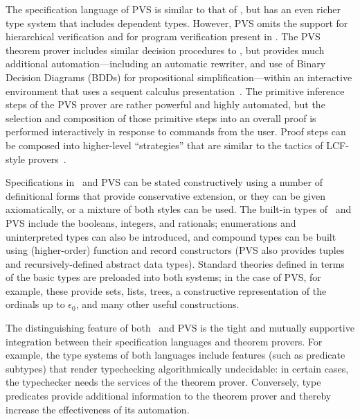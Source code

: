 The specification language of PVS is similar to that of \ehdm, but
has an even richer type system that includes dependent types.
However, PVS omits the support for hierarchical verification and for
program verification present in \ehdm.  The PVS theorem prover
includes similar decision procedures to \ehdm, but provides much
additional automation---including an automatic rewriter, and
use of Binary Decision Diagrams (BDDs) for propositional
simplification---within an interactive
environment that uses a sequent calculus
presentation~\cite{PVS-CADE92}.  The primitive inference steps of the
PVS prover are rather powerful and highly automated, but the
selection and composition of those primitive steps into an overall
proof is performed interactively in response to commands from the
user.  Proof steps can be composed into higher-level ``strategies''
that are similar to the tactics of LCF-style provers~\cite{LCF}.


Specifications in \ehdm\ and PVS can be stated constructively using a
number of definitional forms that provide conservative extension, or
they can be given axiomatically, or a mixture of both styles can be
used.  The built-in types of \ehdm\ and PVS include the booleans,
integers, and rationals; enumerations and uninterpreted types can
also be introduced, and compound types can be built using
(higher-order) function and record constructors (PVS also provides
tuples and recursively-defined abstract data types).  Standard
theories defined in terms of the basic types are preloaded into both
systems; in the case of PVS, for example, these provide sets, lists,
trees, a constructive representation of the ordinals up to
$\epsilon_0$, and many other useful constructions.

The distinguishing feature of both \ehdm\ and PVS is the tight and
mutually supportive integration between their specification languages
and theorem provers.  For example, the type systems of both languages
include features (such as predicate subtypes) that render
typechecking algorithmically undecidable: in certain cases, the
typechecker needs the services of the theorem prover.  Conversely,
type predicates provide additional information to the theorem prover
and thereby increase the effectiveness of its automation.

